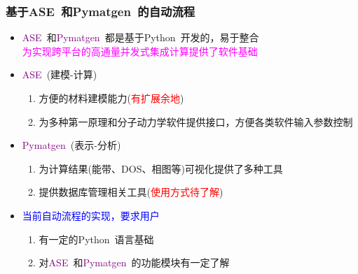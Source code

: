 \documentclass[cjk,slidestop,handout,compress,mathserif,blue]{beamer}	%
\begin{document}
\frame
{
	\frametitle{基于\textrm{ASE~}和\textrm{Pymatgen~}的自动流程}
	\begin{itemize}
		\item \textcolor{purple}{\textrm{ASE~}}和\textcolor{purple}{\textrm{Pymatgen~}}都是基于\textrm{Python~}开发的，易于整合\\
			\textcolor{magenta}{为实现跨平台的高通量并发式集成计算提供了软件基础}
		\item \textcolor{purple}{\textrm{ASE~}}(建模-计算)
			\begin{enumerate}
				\item 方便的材料建模能力(\textcolor{red}{有扩展余地})
				\item 为多种第一原理和分子动力学软件提供接口，方便各类软件输入参数控制
			\end{enumerate}
		\item \textcolor{purple}{\textrm{Pymatgen~}}(表示-分析)
					\begin{enumerate}
						\item 为计算结果(能带、\textrm{DOS}、相图等)可视化提供了多种工具
						\item 提供数据库管理相关工具(\textcolor{red}{使用方式待了解})
					\end{enumerate}
		\item \textcolor{blue}{当前自动流程的实现，要求用户}
				\begin{enumerate}
					\item 有一定的\textrm{Python~}语言基础
					\item 对\textcolor{purple}{\textrm{ASE~}}和\textcolor{purple}{\textrm{Pymatgen~}}的功能模块有一定了解
				\end{enumerate}
	\end{itemize}
}
\end{document}
